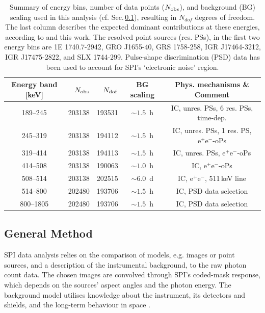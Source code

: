 \documentclass[doublespace,nopageskip]{VTthesis} %
\newcommand{\mrm}[1]{\mathrm{#1}}
\begin{document}
\begin{table}[htb]
	\centering
	\caption{Summary of energy bins, number of data points ($N_{\rm obs}$), and background (BG) scaling used in this analysis (cf. Sec.\,\ref{sec:likelihood_analysis}), resulting in $N_{dof}$ degrees of freedom. The last column describes the expected dominant contributions at these energies, according to \citet{2005A&A...444..495S} and this work. The resolved point sources (res. PSs), in the first two energy bins are 1E 1740.7-2942, GRO J1655-40, GRS 1758-258, IGR J17464-3212, IGR J17475-2822, and SLX 1744-299. Pulse-shape discrimination (PSD) data has been used to account for SPI's `electronic noise' region.}
	\begin{tabular}{crrcc}
        \toprule
		Energy band [keV] & $N_{\rm obs}$ & $N_{\rm dof}$ & BG scaling & Phys. mechanisms \& Comment \\
		\midrule
		189--245  & 203138 & 193531 & $\sim 1.5$~h & IC, unres. PSs, 6 res. PSs, time-dep. \\
		245--319  & 203138 & 194112 & $\sim 1.5$~h & IC, unres. PSs, 1 res. PS, $\mrm{e^+e^-}$-oPs \\
		319--414  & 203138 & 194113 & $\sim 1.5$~h & IC, unres. PSs, $\mrm{e^+e^-}$-oPs \\
		414--508  & 203138 & 190063 & $\sim 1.0$~h & IC, $\mrm{e^+e^-}$-oPs \\
		508--514  & 203138 & 202515 & $\sim 6.0$~d & IC, $\mrm{e^+e^-}$, 511\,keV line\\
		514--800  & 202480 & 193706 & $\sim 1.5$~h & IC, PSD data selection \\
		800--1805 & 202480 & 193706 & $\sim 1.5$~h & IC, PSD data selection \\
        \bottomrule
	\end{tabular}
	\label{tab:data_set_energies}
\end{table}

\subsection{General Method}\label{sec:likelihood_analysis}
%
SPI data analysis relies on the comparison of models, e.g. images or point sources, and a description of the instrumental background, to the raw photon count data.
%
The chosen images are convolved through SPI's coded-mask response, which depends on the sources' aspect angles and the photon energy.
%
The background model utilises knowledge about the instrument, its detectors and shields, and the long-term behaviour in space \citep{2018A&A...611A..12D,2019A&A...626A..73S}.
\end{document}
